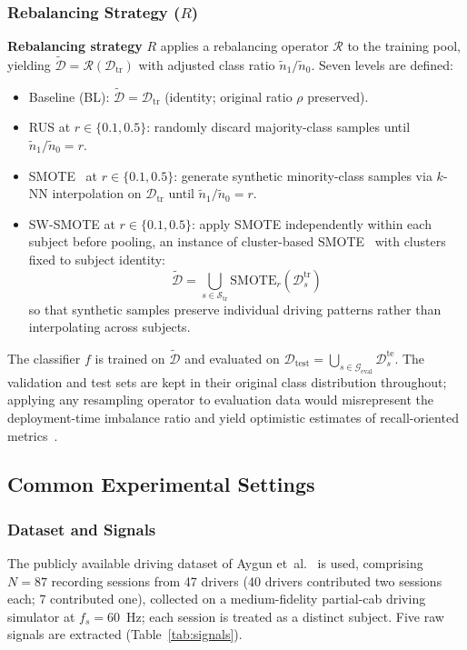 \documentclass[lettersize,journal]{IEEEtran}
\begin{document}
\subsubsection{Rebalancing Strategy ($R$)}\label{sec:rebalancing}
\textbf{Rebalancing strategy} $R$ applies a rebalancing operator $\mathcal{R}$ to the training pool, yielding $\tilde{\mathcal{D}} = \mathcal{R}(\mathcal{D}_{\mathrm{tr}})$ with adjusted class ratio $\tilde{n}_1/\tilde{n}_0$.
Seven levels are defined:
\begin{itemize}
\item Baseline (BL): $\tilde{\mathcal{D}} = \mathcal{D}_{\mathrm{tr}}$ (identity; original ratio $\rho$ preserved).
\item RUS at $r \in \{0.1, 0.5\}$: randomly discard majority-class samples until $\tilde{n}_1 / \tilde{n}_0 = r$.
\item SMOTE~\cite{chawla2002} at $r \in \{0.1, 0.5\}$: generate synthetic minority-class samples via $k$-NN interpolation on $\mathcal{D}_{\mathrm{tr}}$ until $\tilde{n}_1 / \tilde{n}_0 = r$.
\item SW-SMOTE at $r \in \{0.1, 0.5\}$: apply SMOTE independently within each subject before pooling, an instance of cluster-based SMOTE~\cite{douzas2018} with clusters fixed to subject identity:
\begin{equation}
\label{eq:swsmote}
\tilde{\mathcal{D}} = \bigcup_{s \in \mathcal{S}_{\mathrm{tr}}} \mathrm{SMOTE}_r(\mathcal{D}_s^{\mathrm{tr}})
\end{equation}
so that synthetic samples preserve individual driving patterns rather than interpolating across subjects.
\end{itemize}

The classifier $f$ is trained on $\tilde{\mathcal{D}}$ and evaluated on $\mathcal{D}_{\mathrm{test}} = \bigcup_{s \in \mathcal{G}_{\mathrm{eval}}} \mathcal{D}_s^{\mathrm{te}}$.
The validation and test sets are kept in their original class distribution throughout; applying any resampling operator to evaluation data would misrepresent the deployment-time imbalance ratio and yield optimistic estimates of recall-oriented metrics~\cite{he2009,chawla2002}.

\subsection{Common Experimental Settings}\label{sec:common_settings}

\subsubsection{Dataset and Signals}\label{sec:dataset}
The publicly available driving dataset of Aygun et~al.~\cite{aygun2024} is used, comprising $N = 87$ recording sessions from 47 drivers (40 drivers contributed two sessions each; 7 contributed one), collected on a medium-fidelity partial-cab driving simulator at $f_s = 60$~Hz; each session is treated as a distinct subject.
Five raw signals are extracted (Table~\ref{tab:signals}).
\end{document}
